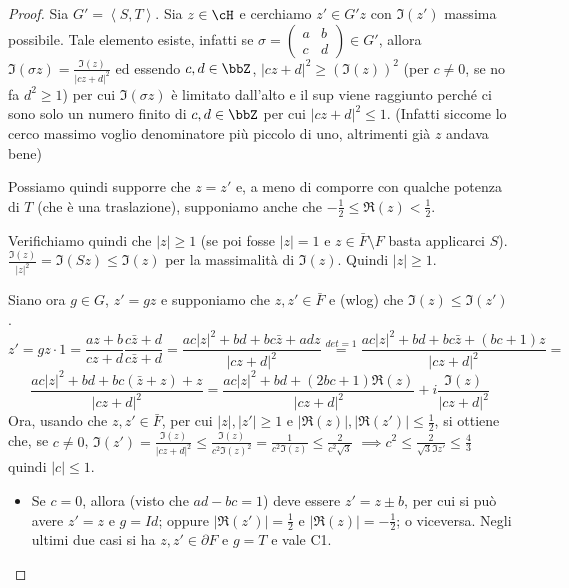 \begin{proof}
Sia $G'=\left\langle S,T \right\rangle$. Sia $z \in \cH$ e cerchiamo $z' \in G'z$ con $\Im(z')$ massima possibile. Tale elemento esiste, infatti se
$\sigma = \left( \begin{array}{cc} a & b \\ c & d \end{array} \right) \in G'$, allora $\Im(\sigma z) = \frac{\Im(z)}{|cz+d|^2}$ ed essendo
$c,d \in \bbZ$, $|cz+d|^2 \geq (\Im(z))^2$ (per $c \neq 0$, se no fa $d^2 \ge 1$) per cui $\Im(\sigma z)$ è limitato dall'alto e il sup viene raggiunto perché
ci sono solo un numero finito di $c,d \in \bbZ$ per cui $|cz+d|^2 \leq 1$. (Infatti siccome lo cerco massimo voglio denominatore più piccolo di uno,
altrimenti già $z$ andava bene)


Possiamo quindi supporre che $z=z'$ e, a meno di comporre con qualche potenza
di $T$ (che è una traslazione), supponiamo anche che $-\frac{1}{2} \leq \Re(z) < \frac{1}{2}$.

Verifichiamo quindi che $|z| \geq 1$ (se poi fosse $|z|=1$ e
$z \in \bar{F} \setminus F$ basta applicarci $S$).
$\frac{\Im(z)}{|z|^2} = \Im(Sz) \leq \Im(z)$ per la massimalità di $\Im(z)$.
Quindi $|z| \geq 1$.
\vskip 0.5cm

Siano ora $g \in G$, $z'=gz$ e supponiamo che $z,z' \in \bar{F}$ e (wlog)
che $\Im(z) \leq \Im(z')$.
$$
z'= gz \cdot 1 = \frac{az+b}{cz+d} \frac{c \bar{z} +d}{c \bar{z} +d} =
\frac{ac|z|^2 + bd + bc \bar{z} + adz}{|cz+d|^2} \stackrel{det=1}{=}
\frac{ac|z|^2 + bd + bc \bar{z} + (bc+1)z}{|cz+d|^2} =
$$
$$
\frac{ac|z|^2 + bd + bc (\bar{z} + z) + z}{|cz+d|^2} =
\frac{ac|z|^2 + bd + (2bc+1) \Re(z)}{|cz+d|^2} + i \frac{\Im(z)}{|cz+d|^2}
$$
Ora, usando che $z,z' \in \bar{F}$, per cui $|z|,|z'| \geq 1$ e
$|\Re(z)|, |\Re(z')| \leq \frac{1}{2}$, si ottiene che, se $c \neq 0$,
$\Im(z') = \frac{\Im(z)}{|cz+d|^2} \leq \frac{\Im(z)}{c^2 \Im(z)^2}
= \frac{1}{c^2 \Im(z)} \leq \frac{2}{c^2 \sqrt{3}}$ $\implies c^2 \le \frac{2}{\sqrt{3}\Im z'} \le \frac{4}{3}$
quindi $|c| \leq 1$.

\begin{itemize}
\item Se $c=0$, allora (visto che $ad - bc = 1$) deve essere $z' = z \pm b$, per cui si può avere $z'=z$ e $g=Id$; oppure
  $|\Re(z')| = \frac{1}{2}$ e $|\Re(z)| = -\frac{1}{2}$; o viceversa.
  Negli ultimi due casi si ha $z,z' \in \partial F$ e $g=T$ e vale C1.


\end{itemize}
\end{proof}

